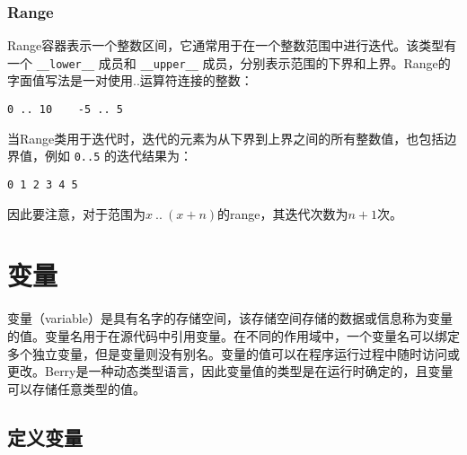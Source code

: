 \subsubsection{Range}

Range容器表示一个整数区间，它通常用于在一个整数范围中进行迭代。该类型有一个 \texttt{\_\_lower\_\_} 成员和 \texttt{\_\_upper\_\_} 成员，分别表示范围的下界和上界。Range的字面值写法是一对使用..运算符连接的整数：
\begin{lstlisting}[language=berry, numbers=none]
0 .. 10    -5 .. 5
\end{lstlisting}

当Range类用于迭代时，迭代的元素为从下界到上界之间的所有整数值，也包括边界值，例如 \texttt{0..5} 的迭代结果为：
\begin{lstlisting}[language=berry, numbers=none]
0 1 2 3 4 5
\end{lstlisting}
因此要注意，对于范围为$x\ ..\ (x+n)$的range，其迭代次数为$n+1$次。

\section{变量}

变量（variable）是具有名字的存储空间，该存储空间存储的数据或信息称为变量的值。变量名用于在源代码中引用变量。在不同的作用域中，一个变量名可以绑定多个独立变量，但是变量则没有别名。变量的值可以在程序运行过程中随时访问或更改。Berry是一种动态类型语言，因此变量值的类型是在运行时确定的，且变量可以存储任意类型的值。

\subsection{定义变量}

